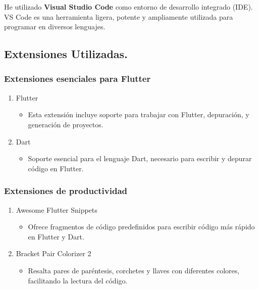 \documentclass{article}
\begin{document}
\begin{flushleft}
He utilizado \textbf{Visual Studio Code}  como entorno de desarrollo integrado (IDE). VS Code es una herramienta ligera, potente y ampliamente utilizada para programar en diversos lenguajes.\\ 

\subsection*{Extensiones Utilizadas.}
\subsubsection*{Extensiones esenciales para Flutter}

\begin{enumerate}
    \item Flutter
        \begin{itemize}
            \item Esta extensión incluye soporte para trabajar con Flutter, depuración, y generación de proyectos.
        \end{itemize}

        \item Dart

        \begin{itemize}
            \item Soporte esencial para el lenguaje Dart, necesario para escribir y depurar código en Flutter.
        \end{itemize}
\end{enumerate}

\subsubsection*{Extensiones de productividad}

\begin{enumerate}
    \item Awesome Flutter Snippets
        \begin{itemize}
            \item Ofrece fragmentos de código predefinidos para escribir código más rápido en Flutter y Dart.
        \end{itemize}

        \item Bracket Pair Colorizer 2

        \begin{itemize}
            \item Resalta pares de paréntesis, corchetes y llaves con diferentes colores, facilitando la lectura del código.
        \end{itemize}


\end{enumerate}
\end{flushleft}
\end{document}

